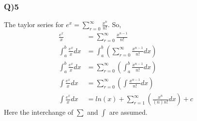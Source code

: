 \documentclass[11pt]{beamer}
\begin{document}
\begin{frame}
\frametitle{Q)5}
The taylor series for $e^x=\sum_{r=0}^{\infty}\frac{x^n}{n!}$. So,
\begin{align*}
\frac{e^x}{x}&= \sum_{r=0}^{\infty}\frac{x^{n-1}}{n!}\\
\int_{a}^{b} \frac{e^x}{x}dx&=\int_{a}^{b} \left( \sum_{r=0}^{\infty}\frac{x^{n-1}}{n!}dx\right)\\
\int_{a}^{b} \frac{e^x}{x}dx&=\sum_{r=0}^{\infty}\left(\int_{a}^{b} \frac{x^{n-1}}{n!}dx\right)\\
\int \frac{e^x}{x}dx&=\sum_{r=0}^{\infty}\left(\int\frac{x^{n-1}}{n!}dx\right)\\
\int \frac{e^x}{x}dx&=ln(x)+\sum_{r=1}^{\infty}\left(\frac{x^{n}}{(n)n!}dx\right)+c
\end{align*}
Here the interchange of $\sum$ and $\int$ are assumed.
\end{frame}
\end{document}
